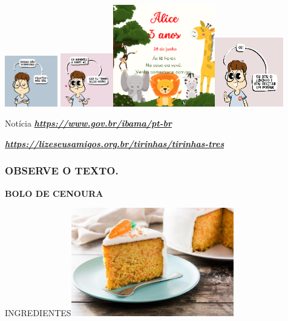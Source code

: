 \begin{escola}
\includegraphics[width=0.90835in,height=0.87172in]{media/image143.png}
\includegraphics[width=0.90912in,height=0.90912in]{media/image145.png}\includegraphics[width=1.74653in,height=1.74653in]{media/image147.png}\includegraphics[width=1.18333in,height=1.18333in]{media/image152.png}

Notícia
\href{https://www.gov.br/ibama/pt-br}{\textbf{\emph{https://www.gov.br/ibama/pt-br}}}

\href{https://lizeseusamigos.org.br/tirinhas/tirinhas-tres}{\textbf{\emph{https://lizeseusamigos.org.br/tirinhas/tirinhas-tres}}}

\subsubsection{OBSERVE O TEXTO. }\label{observe-o-texto.}

\textbf{BOLO DE CENOURA}

INGREDIENTES\includegraphics[width=2.79286in,height=1.86042in]{media/image153.jpg}


\end{escola}
